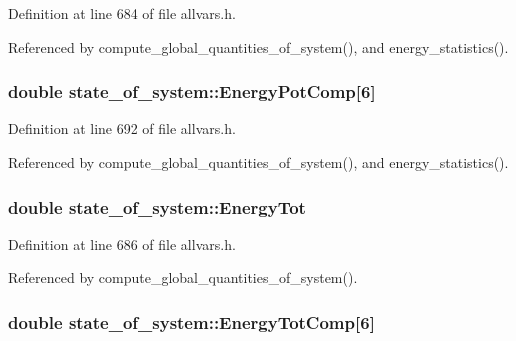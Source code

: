 Definition at line 684 of file allvars.h.



Referenced by compute\_\-global\_\-quantities\_\-of\_\-system(), and energy\_\-statistics().

\hypertarget{structstate__of__system_af495e90a93989d10e7f138c33c5cdad3}{
\subsubsection[{EnergyPotComp}]{\setlength{\rightskip}{0pt plus 5cm}double {\bf state\_\-of\_\-system::EnergyPotComp}\mbox{[}6\mbox{]}}}
\label{structstate__of__system_af495e90a93989d10e7f138c33c5cdad3}


Definition at line 692 of file allvars.h.



Referenced by compute\_\-global\_\-quantities\_\-of\_\-system(), and energy\_\-statistics().

\hypertarget{structstate__of__system_a2e6631f75e195c1b3cc446478bbdf413}{
\subsubsection[{EnergyTot}]{\setlength{\rightskip}{0pt plus 5cm}double {\bf state\_\-of\_\-system::EnergyTot}}}
\label{structstate__of__system_a2e6631f75e195c1b3cc446478bbdf413}


Definition at line 686 of file allvars.h.



Referenced by compute\_\-global\_\-quantities\_\-of\_\-system().

\hypertarget{structstate__of__system_a2e9e012733cab8c6352b8eb23dfa4763}{
\subsubsection[{EnergyTotComp}]{\setlength{\rightskip}{0pt plus 5cm}double {\bf state\_\-of\_\-system::EnergyTotComp}\mbox{[}6\mbox{]}}}
\label{structstate__of__system_a2e9e012733cab8c6352b8eb23dfa4763}



